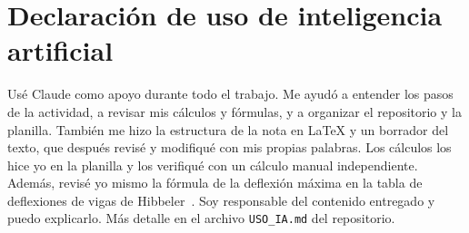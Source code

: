 \documentclass[11pt,a4paper]{article}
\begin{document}
\section*{Declaración de uso de inteligencia artificial}
Usé Claude como apoyo durante todo el trabajo. Me ayudó a entender los pasos de la actividad, a revisar mis cálculos y fórmulas, y a organizar el repositorio y la planilla. También me hizo la estructura de la nota en LaTeX y un borrador del texto, que después revisé y modifiqué con mis propias palabras. Los cálculos los hice yo en la planilla y los verifiqué con un cálculo manual independiente. Además, revisé yo mismo la fórmula de la deflexión máxima en la tabla de deflexiones de vigas de Hibbeler~\cite[Ap.~C, p.~814]{hibbeler}. Soy responsable del contenido entregado y puedo explicarlo. Más detalle en el archivo \texttt{USO\_IA.md} del repositorio.


\end{document}
